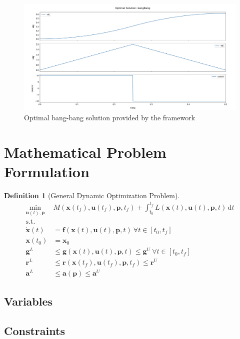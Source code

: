 \documentclass[12pt]{article}
\newtheorem{definition}{Definition}
\renewcommand{\v}{\bm}
\begin{document}
	\begin{figure}[H]
		\centering
		\includegraphics[width=\textwidth]{images/bangBang.png}
		\caption{Optimal bang-bang solution provided by the framework}
		\label{fig:bangBang}
	\end{figure}


	\section{Mathematical Problem Formulation}
	
	\begin{definition}[General Dynamic Optimization Problem]
		\begin{align*}
			\min_{\v{u}(t), \v{p}} ~ & M(\v{x}(t_f), \v{u}(t_f), \v{p}, t_f) + \int_{t_0}^{t_f} L(\v{x}(t), \v{u}(t), \v{p}, t) \, \mathrm{d}t \\
			\text{s.t.}& \\
			\dot{\v{x}}(t) &= \v{f}(\v{x}(t), \v{u}(t), \v{p}, t)\ \forall t \in [t_0, t_f] \\
			\v{x}(t_0) &= \v{x}_0 \\
			\v{g}^{L} &\leq \v{g}(\v{x}(t), \v{u}(t), \v{p}, t) \leq \v{g}^{U}\ \forall t \in [t_0, t_f] \\
			\v{r}^{L} &\leq \v{r}(\v{x}(t_f), \v{u}(t_f), \v{p}, t_f) \leq \v{r}^{U} \\
			\v{a}^{L} &\leq \v{a}(\v{p}) \leq \v{a}^{U}
		\end{align*}
	\end{definition}
	
	
	\subsection{Variables}
	
	\subsection{Constraints}
	
\end{document}
